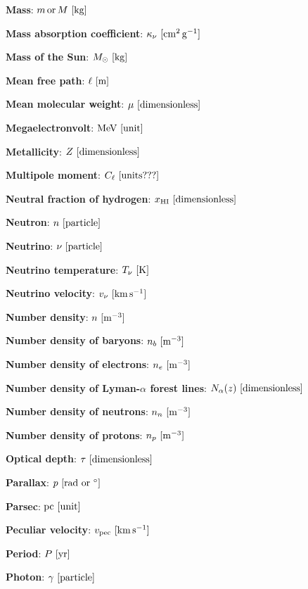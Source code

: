 \documentclass[a4paper,11pt]{article}
\begin{document}
{\noindent}\textbf{Mass}: $m\,{\rm or}\,M ~ [{\rm kg}]$

{\noindent}\textbf{Mass absorption coefficient}: $\kappa_\nu ~ [{\rm cm^2\,g^{-1}}]$

{\noindent}\textbf{Mass of the Sun}: $M_\odot ~ [{\rm kg}]$

{\noindent}\textbf{Mean free path}: $\ell ~ [{\rm m}]$

{\noindent}\textbf{Mean molecular weight}: $\mu ~ [{\rm dimensionless}]$

{\noindent}\textbf{Megaelectronvolt}: ${\rm MeV} ~ [{\rm unit}]$

{\noindent}\textbf{Metallicity}: $Z ~ [{\rm dimensionless}]$

{\noindent}\textbf{Multipole moment}: $C_\ell ~ [{\rm units???}]$

{\noindent}\textbf{Neutral fraction of hydrogen}: $x_\mathrm{HI} ~ [{\rm dimensionless}]$

{\noindent}\textbf{Neutron}: $n ~ [{\rm particle}]$

{\noindent}\textbf{Neutrino}: $\nu ~ [{\rm particle}]$

{\noindent}\textbf{Neutrino temperature}: $T_\nu ~ [{\rm K}]$

{\noindent}\textbf{Neutrino velocity}: $v_\nu ~ [{\rm km\,s^{-1}}]$

{\noindent}\textbf{Number density}: $n ~ [{\rm m^{-3}}]$

{\noindent}\textbf{Number density of baryons}: $n_b ~ [{\rm m^{-3}}]$

{\noindent}\textbf{Number density of electrons}: $n_e ~ [{\rm m^{-3}}]$

{\noindent}\textbf{Number density of Lyman-$\alpha$ forest lines}: $N_\alpha(z) ~ [{\rm dimensionless}]$

{\noindent}\textbf{Number density of neutrons}: $n_n ~ [{\rm m^{-3}}]$

{\noindent}\textbf{Number density of protons}: $n_p ~ [{\rm m^{-3}}]$

{\noindent}\textbf{Optical depth}: $\tau ~ [{\rm dimensionless}]$

{\noindent}\textbf{Parallax}: $p ~ [{\rm rad~or~^\circ}]$

{\noindent}\textbf{Parsec}: ${\rm pc} ~ [{\rm unit}]$

{\noindent}\textbf{Peculiar velocity}: $v_{\rm pec} ~ [{\rm km\,s^{-1}}]$

{\noindent}\textbf{Period}: $P ~ [{\rm yr}]$

{\noindent}\textbf{Photon}: $\gamma ~ [{\rm particle}]$
\end{document}
